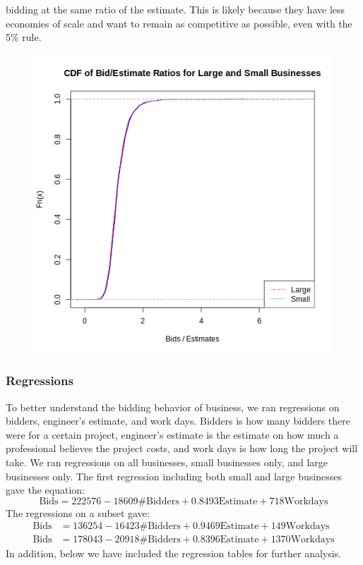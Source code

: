 bidding at the same ratio of the estimate. This is likely because they have less
economies of scale and want to remain as competitive as possible, even with the
5\% rule.
\begin{figure}[htb!]
    \centering
    \includegraphics[scale=0.6]{imgs/cdf-bidest.png}
\end{figure}

\newpage
\subsubsection{Regressions}

To better understand the bidding behavior of business, we ran regressions on
bidders, engineer’s estimate, and work days. Bidders is how many bidders there
were for a certain project, engineer’s estimate is the estimate on how much a
professional believes the project costs, and work days is how long the project
will take. We ran regressions on all businesses, small businesses only, and
large businesses only.
The first regression including both small and large businesses gave the equation:
\[
\text{Bids} = 222576 - 18609 \text{\# Bidders} + 0.8493 \text{Estimate} + 718 \text{Workdays}
\]
The regressions on a subset gave:
\[
\begin{aligned}
\text{Bids} &= 136254 - 16423 \text{\# Bidders} + 0.9469 \text{Estimate} + 149 \text{Workdays} \\
\text{Bids} &= 178043- 20918 \text{\# Bidders} + 0.8396\text{Estimate} + 1370 \text{Workdays}
\end{aligned}
\]
In addition, below we  have included the regression tables for further analysis.
\begin{center}

\end{center}

